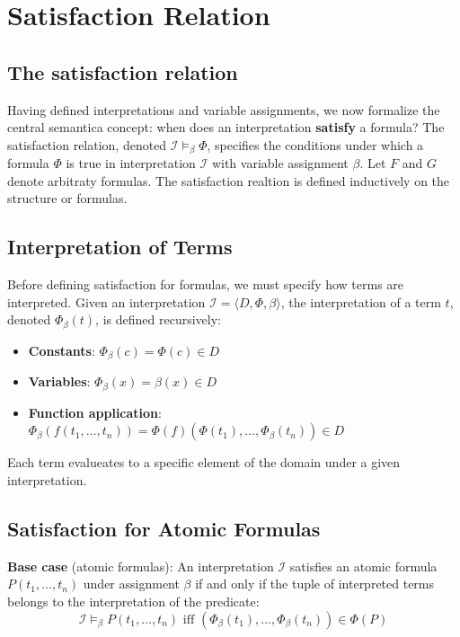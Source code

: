 \documentclass[a4paper]{article}
\theoremstyle{definition}
\begin{document}
\section{Satisfaction Relation}
\subsection{The satisfaction relation}
Having defined interpretations and variable assignments, we now formalize the central semantica concept: when 
does an interpretation \textbf{satisfy} a formula? The satisfaction relation, denoted 
\( \mathcal{I} \models_{\beta} \Phi \), specifies the conditions under which a formula \( \Phi \) is true in interpretation \( \mathcal{I} \) with 
variable assignment \( \beta \).
\vspace{1em}
\noindent
\newline
Let \( F \) and \( G \) denote arbitraty formulas. The satisfaction realtion is defined inductively on the 
structure or formulas.
\subsection{Interpretation of Terms}
Before defining satisfaction for formulas, we must specify how terms are interpreted. Given an interpretation \( \mathcal{I} = \langle D, \Phi, \beta \rangle \),
the interpretation of a term \( t \), denoted \( \Phi_{\beta}(t) \), is defined recursively:
\begin{itemize}
	\item \textbf{Constants}: \( \Phi_{\beta}(c) = \Phi(c) \in D \) 
	\item \textbf{Variables}: \( \Phi_{\beta}(x) = \beta(x) \in D \)   
	\item \textbf{Function application}: \( \Phi_{\beta}(f(t_1, \ldots, t_n)) = \Phi(f)(\Phi(t_1), \ldots, \Phi_{\beta}(t_n)) \in D \) 
\end{itemize}
Each term evalueates to a specific element of the domain under a given interpretation.
\subsection{Satisfaction for Atomic Formulas}
\textbf{Base case} (atomic formulas): An interpretation \( \mathcal{I} \) satisfies an atomic formula \( P(t_1,\ldots, t_n) \) under 
assignment \( \beta \) if and only if the tuple of interpreted terms belongs to the interpretation of the predicate:
\[
  \mathcal{I} \models_{\beta} P(t_1,\ldots,t_n) \text{ iff } (\Phi_{\beta}(t_1), \ldots, \Phi_{\beta}(t_n)) \in \Phi(P)
\]
\end{document}
